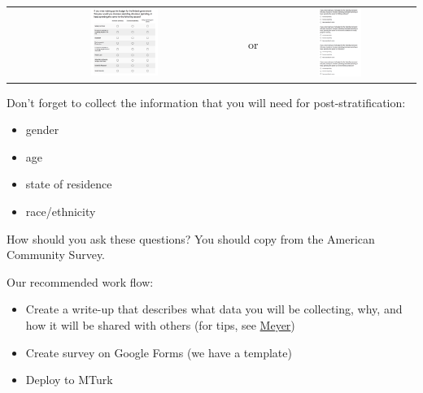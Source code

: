 \documentclass[aspectratio=169]{beamer}
\begin{document}
\begin{frame}

\begin{center}
\begin{tabular}{ccc}
\includegraphics[width=0.30\textwidth]{figures/MTurk_survey_grid} & \phantom{12} \LARGE{or} \phantom{12}  & \includegraphics[width=0.30\textwidth]{figures/MTurk_survey_list}
\end{tabular}
\end{center}

\end{frame}
\begin{frame}

Don't forget to collect the information that you will need for post-stratification: \pause
\begin{itemize}
\item gender
\item age
\item state of residence
\item race/ethnicity
\end{itemize}

How should you ask these questions?  \pause You should copy from the American Community Survey.

\end{frame}
\begin{frame}

Our recommended work flow:
\begin{itemize}
\item Create a write-up that describes what data you will be collecting, why, and how it will be shared with others (for tips, see \href{https://doi.org/10.1177/2515245917747656}{Meyer})
\item Create survey on Google Forms (we have a template)
\pause
\item Deploy to MTurk
\end{itemize}

\end{frame}
\end{document}
